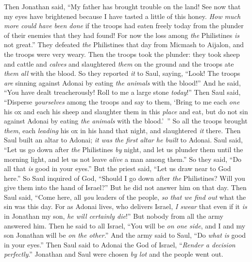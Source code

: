 \begin{biblechapter}
\verse Then Jonathan said, “My father has brought trouble on the land! See now that my eyes have brightened because I have tasted a little of this honey.
\verse \textit{How much more could have been done} if the troops had eaten freely today from the plunder of their enemies that they had found! For now the loss among \textit{the} Philistines \textit{is} not great.”
\verse They defeated \textit{the} Philistines that day from Micmash to Aijalon, and the troops were very weary.
\verse Then the troops took the plunder: they took sheep and cattle and \textit{calves} and slaughtered \textit{them} on the ground and the troops ate \textit{them all} with the blood.
\verse So they reported \textit{it} to Saul, saying, “Look! The troops \textit{are} sinning against Adonai by eating \textit{the animals} with the blood!” And he said, “You have dealt treacherously! Roll to me a large stone \textit{today}!”
\verse Then Saul said, “Disperse \textit{yourselves} among the troops and say to them, ‘Bring to me each \textit{one} his ox and each his sheep and slaughter them in this \textit{place} and eat, but do not sin against Adonai by eating \textit{the animals} with the blood.’ ” So all the troops brought \textit{them}, each \textit{leading} his ox in his hand that night, and slaughtered \textit{it} there.
 Then Saul built an altar to Adonai; \textit{it was the first altar he built} to Adonai.
\verse Saul said, “Let us go down after \textit{the} Philistines \textit{by} night, and let us plunder them until the morning light, and let us not leave \textit{alive} a man among them.” So they said, “Do all that \textit{is} good in your eyes.” But the priest said, “Let us draw near to God here.”
\verse So Saul inquired of God, “Should I go down after \textit{the} Philistines? Will you give them into the hand of Israel?” But he did not answer him on that day.
\verse Then Saul said, “Come here, all \textit{you} leaders of the people, \textit{so that we find out} what the sin was this day.
\verse For as Adonai lives, who delivers Israel, \textit{I swear} that even if it \textit{is} in Jonathan my son, \textit{he will certainly die}!” But nobody from all the army answered him.
\verse Then he said to all Israel, “You will be \textit{on one side}, and I and my son Jonathan will be \textit{on the other}.” And the army said to Saul, “Do \textit{what is} good in your eyes.”
\verse Then Saul said to Adonai the God of Israel, “\textit{Render a decision perfectly}.” Jonathan and Saul were chosen \textit{by lot} and the people went out.

\end{biblechapter}
